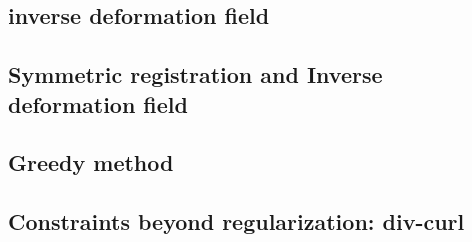\documentclass[letterpaper,12pt]{article}
\begin{document}
\subsection{inverse deformation field}
\subsection{Symmetric registration and Inverse deformation field}
\subsection{Greedy method}
\subsection{Constraints beyond regularization: div-curl}














\end{document}
